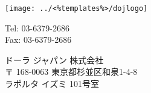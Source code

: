 
\parbox[t]{.30\textwidth}{
\vspace{0.0cm}
\texttt{[image: ../<\%templates\%>/dojlogo]} \\
}
\parbox[t]{.17\textwidth}{
\vspace{1.0cm}
     \small Tel: 03-6379-2686 \\
     \small Fax: 03-6379-2686
}
\parbox[t]{.47\textwidth}{
	ドーラ ジャパン 株式会社 \\
	〒 168-0063 東京都杉並区和泉1-4-8 \\
	ラポルタ イズミ 101号室 \\
}
